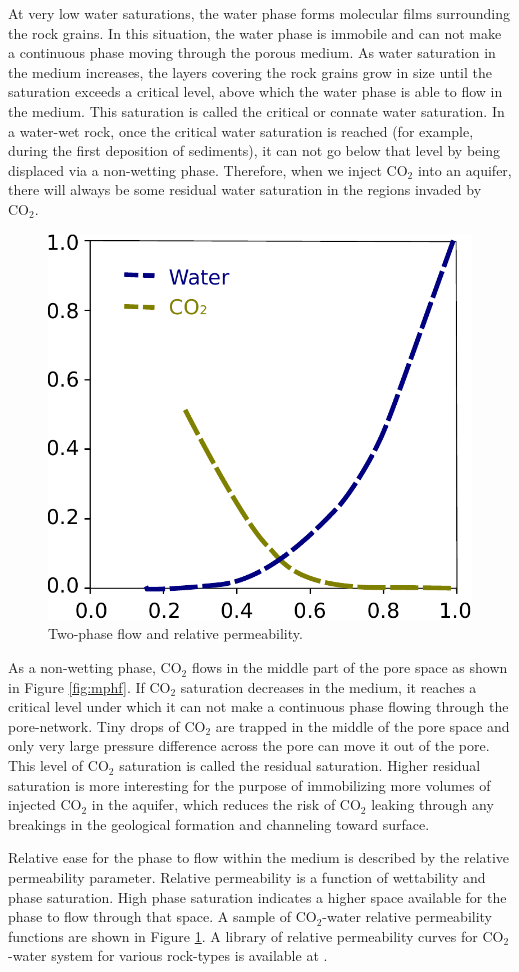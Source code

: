 At very low water saturations, the water phase forms molecular films surrounding the rock grains. In this situation, the water phase is immobile and can not make a continuous phase moving through the porous medium.
As water saturation in the medium increases, the layers covering the rock grains
grow in size until the saturation exceeds a critical level, above which the
water phase is able to flow in the medium. This saturation is called the
critical or connate water saturation. In a water-wet rock, once the
critical water saturation
is reached (for example, during the first deposition of sediments), it can not
go below that level by being displaced via a non-wetting phase. Therefore, when
we inject $\mbox{CO}_2$ into an aquifer, there will always be some residual
water saturation in the regions invaded by $\mbox{CO}_2$.

\begin{figure} 
  \centering{}
  \includegraphics[width= 0.45 \linewidth]{./figurer/Kr}
  \caption{Two-phase flow and relative permeability.}
  \label{fig:kr}
\end{figure}

As a non-wetting phase, $\mbox{CO}_2$ flows in the middle part of the pore space
as shown in Figure \ref{fig:mphf}. If $\mbox{CO}_2$ saturation decreases in the
medium, it reaches a critical level under which it can not make a continuous
phase flowing through the pore-network. Tiny drops of $\mbox{CO}_2$ are trapped
in the middle of the pore space and only very large pressure difference across
the pore can move it out of the pore. This level of $\mbox{CO}_2$ saturation  is
called the residual saturation. Higher residual saturation is more interesting
for the purpose of immobilizing more volumes of injected $\mbox{CO}_2$ in the
aquifer, which reduces the risk of $\mbox{CO}_2$ leaking through any breakings
in the geological formation and channeling toward surface.

Relative ease for the phase to flow within the medium is described by
the relative
permeability parameter. Relative permeability is a function of wettability and
phase saturation. High phase saturation indicates a higher space available for
the phase to flow through that space. A sample of $\mbox{CO}_2$-water relative
permeability functions are shown in Figure \ref{fig:kr}. A library of relative
permeability curves for $\mbox{CO}_2$-water system for various rock-types is
available at \cite{krLib}.

